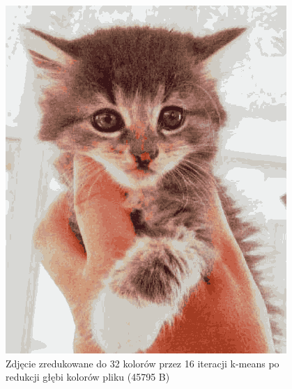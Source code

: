 \begin{figure}[H]
\begin{minipage}[b]{0.25\textwidth}
    \includegraphics[width=\textwidth]{photos/kmeans_red_32_16}
    \caption{Zdjęcie zredukowane do 32 kolorów przez 16 iteracji k-means po redukcji głębi kolorów pliku (45795 B)}
  \end{minipage}
  \hfill
  \begin{minipage}[b]{0.25\textwidth}

\end{minipage}
\end{figure}
